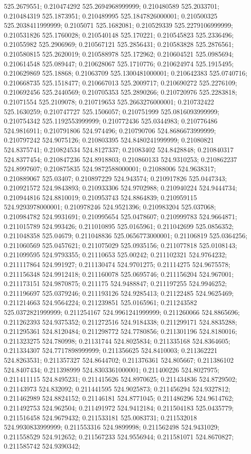 525.2679551; 0.210474292 525.2694968999999; 0.210480589 525.2033701; 0.210484319 525.1873951; 0.210489995 525.1847826000001; 0.210500325 525.2038411999999; 0.2105071 525.1682081; 0.210529339 525.2279106999999; 0.210531826 525.1760028; 0.210540148 525.170221; 0.210545823 525.2336496; 0.21055982 525.2906969; 0.210567121 525.2856431; 0.210583828 525.2876561; 0.210580815 525.2620019; 0.210588978 525.172962; 0.210604521 525.0985694; 0.210614548 525.089447; 0.210628067 525.1710776; 0.210624974 525.1915495; 0.210629869 525.18868; 0.21063709 525.1300481000001; 0.210642383 525.0740716; 0.210668735 525.1518477; 0.210667013 525.2009717; 0.210690272 525.2276109; 0.210692456 525.2440569; 0.210705353 525.2890266; 0.210720976 525.2283818; 0.21071554 525.2109078; 0.210719653 525.2663276000001; 0.210732422 525.1630259; 0.210747727 525.1506057; 0.210751999 525.0816093999999; 0.210754342 525.1192553999999; 0.210772436 525.0344983; 0.210776486 524.9816911; 0.210791806 524.974496; 0.210790706 524.8686673999999; 0.210797242 524.9075126; 0.210803395 524.8480241999999; 0.21080821 524.8375741; 0.210824534 524.8127337; 0.21083402 524.8428848; 0.210840317 524.8377454; 0.210847236 524.8918803; 0.210860133 524.9310253; 0.210862237 524.8997607; 0.210875835 524.9872588000001; 0.21088006 524.9638317; 0.210889067 525.03407; 0.210897229 524.943574; 0.210917826 525.0447343; 0.210921572 524.9843893; 0.210933306 524.9702988; 0.210940224 524.9444734; 0.210944816 524.8810019; 0.210953743 524.8864839; 0.210959115 524.9293978000001; 0.210978246 524.9521396; 0.210983204 525.037068; 0.210984782 524.9931691; 0.210995654 525.0478607; 0.210999783 524.9664871; 0.211015789 524.993426; 0.211010895 525.0165961; 0.211042699 525.0856352; 0.211048358 525.04679; 0.211048836 525.0656773000001; 0.21106819 525.0364256; 0.211060569 525.0457621; 0.211075029 525.0935156; 0.211077818 525.0108143; 0.211099595 524.9793355; 0.21110653 525.00242; 0.211102321 524.9764232; 0.211117864 524.991927; 0.211130474 524.9701275; 0.21114275 524.9675578; 0.211156348 524.9912418; 0.211160078 525.0695746; 0.211156204 524.967001; 0.211173151 524.9870875; 0.211175 524.9488847; 0.211197255 524.9946252; 0.211196697 525.0379246; 0.211193126 524.9285413; 0.21122485 524.9625469; 0.211214663 524.9564224; 0.211239851 525.0165961; 0.211243582 525.0372821999999; 0.211254167 524.9961241999999; 0.211260066 524.8865696; 0.211262393 524.9375352; 0.211272516 524.9184338; 0.211299171 524.8835288; 0.211295361 524.8120484; 0.211298772 524.7780856; 0.211301196 524.8180016; 0.211323275 524.780998; 0.21131744 524.8025834; 0.211335168 524.8364605; 0.211334307 524.7717898999999; 0.211356625 524.8410003; 0.211362221 524.8263531; 0.211357327 524.8644702; 0.211376361 524.805667; 0.211386102 524.8407434; 0.211398999 524.8303361000001; 0.211400226 524.8027975; 0.211411115 524.8495231; 0.211415626 524.8970625; 0.211434836 524.8729502; 0.21143973 524.832092; 0.211441595 524.9025873; 0.211456294 524.9327812; 0.211462989 524.8824152; 0.21146181 524.8771045; 0.211486296 524.9614762; 0.211492753 524.962504; 0.211491972 524.9412184; 0.211504183 525.0435779; 0.211516458 524.9679432; 0.211533181 525.0083731; 0.211532018 524.9930833999999; 0.211553316 524.9899998; 0.211562498 524.9431029; 0.211558529 524.912652; 0.211567233 524.9556944; 0.211581071 524.8670827; 0.211585742 524.9390342; 